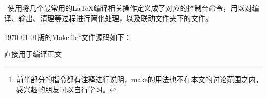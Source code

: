 \dk~使用将几个最常用的{\LaTeX}编译相关操作定义成了对应的控制台命令，用以对编译、输出、清理等过程进行简化处理，以及联动文件夹下的文件。

{\today}版的Makefile\footnote{前半部分的指令都有注释进行说明，make的用法也不在本文的讨论范围之内，感兴趣的朋友可以自行学习。}文件源码如下：


直接用于编译正文

\clearpage
